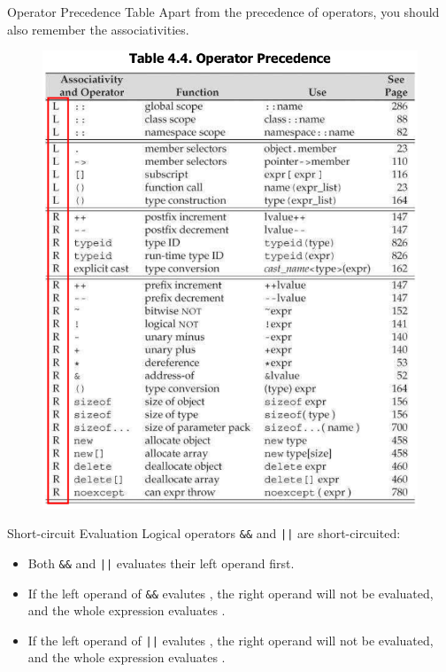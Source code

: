 \documentclass[handout]{beamer}
\begin{document}
\begin{frame}{Operator Precedence Table}
    Apart from the precedence of operators, you should also remember the associativities.
    \begin{figure}[h]
        \centering
        \includegraphics[height=0.7\textheight]{img/precedence.png}
    \end{figure}
\end{frame}

\begin{frame}{Short-circuit Evaluation}
    Logical operators \texttt{\&\&} and \texttt{||} are short-circuited:
    \begin{itemize}
        \item Both \texttt{\&\&} and \texttt{||} evaluates their left operand first.
        \item If the left operand of \texttt{\&\&} evalutes , the right operand will not be evaluated, and the whole expression evaluates .
        \item If the left operand of \texttt{||} evalutes , the right operand will not be evaluated, and the whole expression evaluates .
    \end{itemize}
\end{frame}
\end{document}
